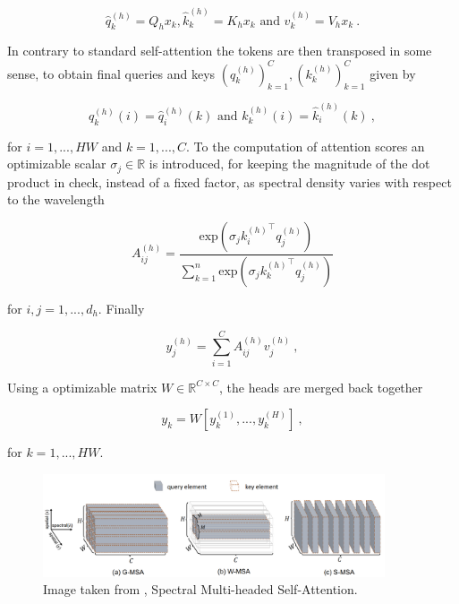     $$ \hat{q}_k^{(h)} = Q_h x_k, \hat{k}_k^{(h)} = K_h x_k \text{ and } \hat{v}_k^{(h)} = V_h x_k ~. $$

In contrary to standard self-attention the tokens are then transposed in some sense, 
to obtain final queries and keys $(q_k^{(h)})_{k=1}^{C}, (k_k^{(h)})_{k=1}^{C}$
given by

    $$ q_k^{(h)}(i) = \hat{q}_i^{(h)}(k) \text{ and } k_k^{(h)}(i) = \hat{k}_i^{(h)}(k) ~, $$

for $i = 1, ..., HW$ and $k = 1, ..., C$.
To the computation of attention scores an optimizable scalar $\sigma_j \in \mathbb R$ is introduced,
for keeping the magnitude of the dot product in check,
instead of a fixed factor,
as spectral density varies with respect to the wavelength

    $$ A_{ij}^{(h)} = \frac{\text{exp} \left( \sigma_j {k_{i}^{(h)}}^\top q_{j}^{(h)} \right)}{\sum_{k = 1}^n \text{exp} \left( \sigma_j {k_{k}^{(h)}}^\top q_{j}^{(h)} \right)} $$

for $i, j = 1, ..., d_h$.
Finally 

    $$y_j^{(h)} = \sum_{i=1}^{C} A_{ij}^{(h)} v_j^{(h)} ~, $$

Using a optimizable matrix $W \in \mathbb R^{C \times C}$, 
the heads are merged back together 

    $$y_k = W [y_k^{(1)}, ..., y_k^{(H)}] ~, $$

for $k = 1, ..., HW$.

\begin{figure}[h!]
    \includegraphics[width=0.9\textwidth]{models/ssr/imgs/smsa.png}
    \caption{Image taken from \cite{caiMSTMultistageSpectralwise2022a}, Spectral Multi-headed Self-Attention.}
    \label{fig:smsa}
\end{figure}